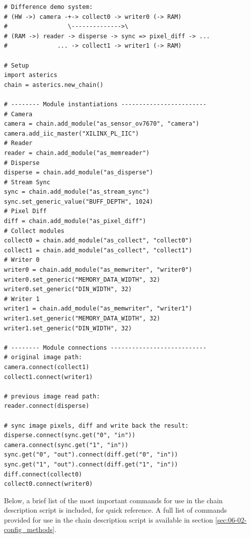 \begin{lstlisting}[style=AutomaticsPython, label=Code:06-02-define_diff, caption=Definition of a system calculating pixel value differences over time]
# Difference demo system:
# (HW ->) camera -+-> collect0 -> writer0 (-> RAM)
#                 \-------------->\ 
# (RAM ->) reader -> disperse -> sync => pixel_diff -> ... 
#              ... -> collect1 -> writer1 (-> RAM)

# Setup
import asterics
chain = asterics.new_chain()

# -------- Module instantiations ------------------------
# Camera
camera = chain.add_module("as_sensor_ov7670", "camera")
camera.add_iic_master("XILINX_PL_IIC")
# Reader
reader = chain.add_module("as_memreader")
# Disperse
disperse = chain.add_module("as_disperse")
# Stream Sync
sync = chain.add_module("as_stream_sync")
sync.set_generic_value("BUFF_DEPTH", 1024)
# Pixel Diff
diff = chain.add_module("as_pixel_diff")
# Collect modules
collect0 = chain.add_module("as_collect", "collect0")
collect1 = chain.add_module("as_collect", "collect1")
# Writer 0
writer0 = chain.add_module("as_memwriter", "writer0")
writer0.set_generic("MEMORY_DATA_WIDTH", 32)
writer0.set_generic("DIN_WIDTH", 32)
# Writer 1
writer1 = chain.add_module("as_memwriter", "writer1")
writer1.set_generic("MEMORY_DATA_WIDTH", 32)
writer1.set_generic("DIN_WIDTH", 32)

# -------- Module connections ---------------------------
# original image path:
camera.connect(collect1)
collect1.connect(writer1)

# previous image read path:
reader.connect(disperse)

# sync image pixels, diff and write back the result:
disperse.connect(sync.get("0", "in"))
camera.connect(sync.get("1", "in"))
sync.get("0", "out").connect(diff.get("0", "in"))
sync.get("1", "out").connect(diff.get("1", "in"))
diff.connect(collect0)
collect0.connect(writer0)
\end{lstlisting}

\bigskip

Below, a brief list of the most important commands for use in the chain description script is included, for quick reference.
A full list of commands provided for use in the chain description script is available in section \ref{sec:06-02-config_methods}.

